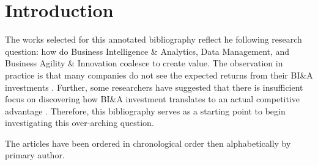 \section{Introduction}

The works selected for this annotated bibliography reflect he following research question: how do Business Intelligence \& Analytics, Data Management, and Business Agility \& Innovation coalesce to create value. The observation in practice is that many companies do not see the expected returns from their BI\&A investments \parencite{finkBusinessIntelligenceOrganizational2017}. Further, some researchers have suggested that there is insufficient focus on discovering how BI\&A investment translates to an actual competitive advantage \parencite{trieuGettingValueBusiness2017}. Therefore, this bibliography serves as a starting point to begin investigating this over-arching question.

The articles have been ordered in chronological order then alphabetically by primary author.

\newpage
